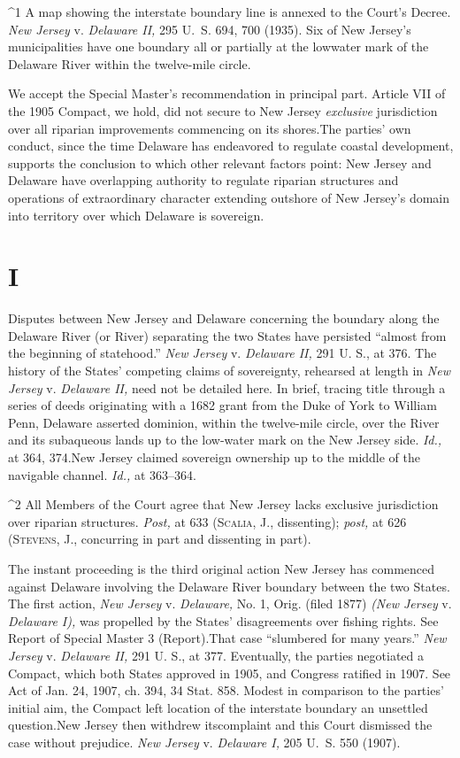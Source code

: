 {^1 A map showing the interstate boundary line is annexed to the
Court's Decree. \emph{New Jersey} v. \emph{Delaware II,} 295 U.~S. 694,
700 (1935). Six of New Jersey's municipalities have one boundary
all or partially at the lowwater mark of the Delaware River within the
twelve-mile circle.

  We accept the Special Master's recommendation in principal part.
Article VII of the 1905 Compact, we hold, did not secure to New Jersey
\emph{exclusive} jurisdiction over all riparian improvements commencing on
its shores.\footnotemark[2] The parties' own conduct, since the time Delaware
has endeavored to regulate coastal development, supports the conclusion
to which other relevant factors point: New Jersey and Delaware have
overlapping authority to regulate riparian structures and operations of
extraordinary character extending outshore of New Jersey's domain into
territory over which Delaware is sovereign.

\section{I}

  Disputes between New Jersey and Delaware concerning the boundary
along the Delaware River (or River) separating the two States have
persisted ``almost from the beginning of statehood.'' \emph{New Jersey}
v. \emph{Delaware II,} 291 U. S., at 376. The history of the States'
competing claims of sovereignty, \newpage  rehearsed at length in \emph{New
Jersey} v. \emph{Delaware II,} need not be detailed here. In brief,
tracing title through a series of deeds originating with a 1682 grant
from the Duke of York to William Penn, Delaware asserted dominion,
within the twelve-mile circle, over the River and its subaqueous lands
up to the low-water mark on the New Jersey side. \emph{Id.,} at 364,
374.\footnotemark[3] New Jersey claimed sovereign ownership up to the middle of
the navigable channel. \emph{Id.,} at 363--364.

^2 All Members of the Court agree that New Jersey lacks exclusive
jurisdiction over riparian structures. \emph{Post,} at 633 (\textsc{Scalia,
J.,} dissenting); \emph{post,} at 626 (\textsc{Stevens,} J., concurring in part
and dissenting in part).

  The instant proceeding is the third original action New Jersey has
commenced against Delaware involving the Delaware River boundary between
the two States. The first action, \emph{New Jersey} v. \emph{Delaware,}
No. 1, Orig. (filed 1877) \emph{(New Jersey} v. \emph{Delaware I),} was
propelled by the States' disagreements over fishing rights. See
Report of Special Master 3 (Report).\footnotemark[4] That case ``slumbered
for many years.'' \emph{New Jersey} v. \emph{Delaware II,} 291 U. S., at
377. Eventually, the parties negotiated a Compact, which both States
approved in 1905, and Congress ratified in 1907. See Act of Jan. 24,
1907, ch. 394, 34 Stat. 858. Modest in comparison to the parties'
initial aim, the Compact left location of the interstate boundary an
unsettled question.\footnotemark[5] New Jersey then withdrew its\newpage  complaint
and this Court dismissed the case without prejudice. \emph{New Jersey} v.
\emph{Delaware I,} 205 U.~S. 550 (1907).

}

